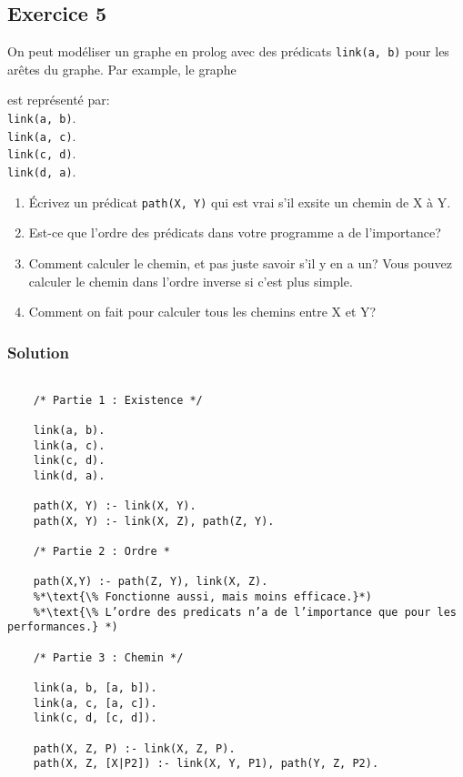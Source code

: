 \subsection*{Exercice 5}
On peut mod\'{e}liser un graphe en prolog avec des pr\'{e}dicats \texttt{link(a, b)} pour les ar\^{e}tes du graphe. Par example,
le graphe
\begin{center}
\end{center}
est repr\'{e}sent\'{e} par: \\

\noindent \texttt{link(a, b)}. \\
\texttt{link(a, c)}. \\
\texttt{link(c, d)}. \\
\texttt{link(d, a)}.

\begin{enumerate}
 \item \'{E}crivez un pr\'{e}dicat \texttt{path(X, Y)} qui est vrai s'il exsite un chemin de X \`{a} Y.
 \item Est-ce que l'ordre des pr\'{e}dicats dans votre programme a de l'importance?
 \item Comment calculer le chemin, et pas juste savoir s'il y en a un? Vous pouvez calculer le
 chemin dans l'ordre inverse si c'est plus simple.
 \item Comment on fait pour calculer tous les chemins entre X et Y?
\end{enumerate}

    \subsubsection{Solution}
    \begin{lstlisting}
    
    /* Partie 1 : Existence */
    
    link(a, b).
    link(a, c).
    link(c, d).
    link(d, a).
    
    path(X, Y) :- link(X, Y).
    path(X, Y) :- link(X, Z), path(Z, Y).
    
    /* Partie 2 : Ordre *
    
    path(X,Y) :- path(Z, Y), link(X, Z).
    %*\text{\% Fonctionne aussi, mais moins efficace.}*)
    %*\text{\% L’ordre des predicats n’a de l’importance que pour les performances.} *)
    
    /* Partie 3 : Chemin */
    
    link(a, b, [a, b]).
    link(a, c, [a, c]).
    link(c, d, [c, d]).
    
    path(X, Z, P) :- link(X, Z, P).
    path(X, Z, [X|P2]) :- link(X, Y, P1), path(Y, Z, P2).
    \end{lstlisting}
    

